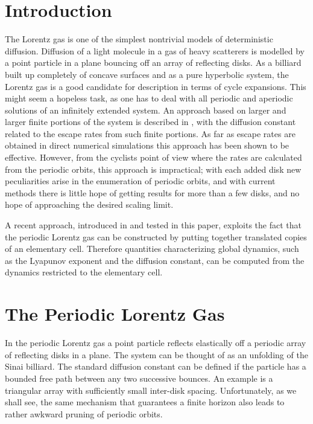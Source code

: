 \documentclass[pre,preprint,groupedaddress,showpacs,showkeys]{revtex4}
\begin{document}
\section{Introduction}
The Lorentz gas is one of the simplest nontrivial models
of deterministic diffusion.
Diffusion of a light molecule in a gas of heavy scatterers
is modelled
by a point particle in a plane bouncing off an array of reflecting disks.
As a billiard built up completely of
concave surfaces and as a pure hyperbolic system, the
Lorentz gas is a good candidate for description in terms of cycle
expansions.
This might seem a hopeless task, as one
has to deal with all periodic and aperiodic
solutions of an infinitely extended system. An
approach based on larger and larger finite portions of the system is described
in , with the diffusion constant related to
the escape rates from such finite portions.
As far as escape rates are obtained in direct numerical simulations
this approach has been shown to be effective.
However, from the cyclists point of view
where the rates are calculated from the periodic orbits,
this approach is impractical; with each added disk new peculiarities arise
in the enumeration of periodic orbits, and with current
methods there is little hope of getting results for more than a few disks,
and no hope of approaching the desired scaling limit.

A recent approach, introduced in  and
tested in this paper, exploits the fact that the periodic Lorentz
gas
can be constructed by putting together
translated copies of an elementary cell.
Therefore quantities characterizing global dynamics, such as
the Lyapunov exponent and the diffusion constant, can be
computed from the dynamics restricted to the elementary cell.

\section{The Periodic Lorentz Gas}
In the periodic Lorentz gas
a point particle reflects elastically off
a periodic array of reflecting disks in a plane.
The system can
be thought of as an unfolding of the Sinai billiard.
The standard diffusion constant can be defined if the particle has a bounded
free path between any two successive bounces.
An example is a triangular array with sufficiently small
inter-disk spacing.
Unfortunately, as we shall see,
the same mechanism that guarantees a finite horizon
also leads to rather awkward pruning of periodic orbits.
\end{document}

